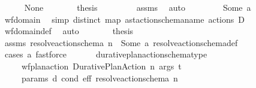 \begin{isabellebody}
\ \ \ \ \isamarkupfalse%
\ None\isanewline
\ \ \ \ \isamarkupfalse%
\ \isamarkupfalse%
\ {\isacharquery}{\kern0pt}thesis\ \isanewline
\ \ \ \ \ \ \isamarkupfalse%
\ assms\ \isamarkupfalse%
\ auto\isanewline
\ \ \isamarkupfalse%
\isanewline
\ \ \ \ \isamarkupfalse%
\ {\isacharparenleft}{\kern0pt}Some\ a{\isacharparenright}{\kern0pt}\isanewline
\ \ \ \ \isamarkupfalse%
\ wf{\isacharunderscore}{\kern0pt}domain\ \isamarkupfalse%
\ {\isacharbrackleft}{\kern0pt}simp{\isacharbrackright}{\kern0pt}{\isacharcolon}{\kern0pt}\ {\isachardoublequoteopen}distinct\ {\isacharparenleft}{\kern0pt}map\ ast{\isacharunderscore}{\kern0pt}action{\isacharunderscore}{\kern0pt}schema{\isachardot}{\kern0pt}name\ {\isacharparenleft}{\kern0pt}actions\ D{\isacharparenright}{\kern0pt}{\isacharparenright}{\kern0pt}{\isachardoublequoteclose}\isanewline
\ \ \ \ \ \ \isamarkupfalse%
\ wf{\isacharunderscore}{\kern0pt}domain{\isacharunderscore}{\kern0pt}def\ \isamarkupfalse%
\ auto\isanewline
\ \ \ \ \isamarkupfalse%
\ \isamarkupfalse%
\ {\isacharquery}{\kern0pt}thesis\ \isanewline
\ \ \ \ \ \ \isamarkupfalse%
\ assms\ {\isacartoucheopen}resolve{\isacharunderscore}{\kern0pt}action{\isacharunderscore}{\kern0pt}schema\ n\ {\isacharequal}{\kern0pt}\ Some\ a{\isacartoucheclose}\ resolve{\isacharunderscore}{\kern0pt}action{\isacharunderscore}{\kern0pt}schema{\isacharunderscore}{\kern0pt}def\isanewline
\ \ \ \ \ \ \isamarkupfalse%
\ {\isacharparenleft}{\kern0pt}cases\ a{\isacharparenright}{\kern0pt}\ fastforce{\isacharplus}{\kern0pt}\isanewline
\ \ \isamarkupfalse%
%
\endisatagproof
{\isafoldproof}%
%
\isadelimproof
\isanewline
%
\endisadelimproof
\isanewline
\ \ \isamarkupfalse%
\ durative{\isacharunderscore}{\kern0pt}plan{\isacharunderscore}{\kern0pt}action{\isacharunderscore}{\kern0pt}schema{\isacharunderscore}{\kern0pt}type{}{\isacharcolon}{\kern0pt}\isanewline
\ \ \ \ \ {\isachardoublequoteopen}wf{\isacharunderscore}{\kern0pt}plan{\isacharunderscore}{\kern0pt}action\ {\isacharparenleft}{\kern0pt}Durative{\isacharunderscore}{\kern0pt}Plan{\isacharunderscore}{\kern0pt}Action\ n\ args\ t{\isacharprime}{\kern0pt}{\isacharparenright}{\kern0pt}{\isachardoublequoteclose}\isanewline
\ \ \ \ \ {\isachardoublequoteopen}{\isasymexists}params\ d\ cond\ eff{\isachardot}{\kern0pt}\ resolve{\isacharunderscore}{\kern0pt}action{\isacharunderscore}{\kern0pt}schema\ n\ \isanewline

\end{isabellebody}
